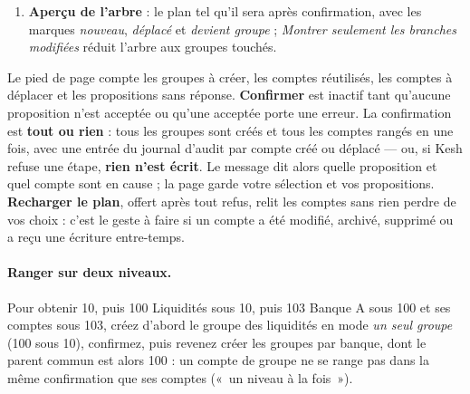 \documentclass[a4paper,11pt,oneside]{article}
\begin{document}
\begin{enumerate}
    Chaque proposition est \emph{en attente} à l'ouverture. \textbf{Accepter} la retient (le bouton
    est inactif tant qu'elle porte une erreur), \textbf{Écarter} la désactive --- elle n'entre ni dans
    l'aperçu ni dans la confirmation, et ses erreurs ne bloquent rien ---, \textbf{Revenir} la remet
    en attente. Changer de sélection recalcule les propositions en gardant vos choix sur
    celles qui restent : ce que vous avez modifié (numéro, nom, parent, comptes décochés, état) est
    gardé, le reste suit la nouvelle sélection. Changer de mode affiche les propositions de l'autre
    mode, avec les choix que vous y aviez faits ; ceux du premier mode vous attendent si vous y
    revenez. Une proposition acceptée dont un changement de la
    \textbf{sélection} modifie les comptes \textbf{repasse en attente} : acceptez-la de nouveau. Si la
    sélection revient exactement aux comptes acceptés, elle \textbf{redevient acceptée} d'elle-même,
    sans nouveau clic, avec les champs tels que vous les avez laissés --- l'aperçu et le pied de page
    montrent cet état. Décocher un compte \emph{dans la proposition} ne la remet pas en attente : elle
    reste acceptée, avec un compte de moins. Un parent choisi qui devient l'un des comptes
    de la proposition est remis \emph{à choisir}.
    \item \textbf{Aperçu de l'arbre} : le plan tel qu'il sera après confirmation, avec les marques
    \emph{nouveau}, \emph{déplacé} et \emph{devient groupe} ; \emph{Montrer seulement les branches
    modifiées} réduit l'arbre aux groupes touchés.
\end{enumerate}

Le pied de page compte les groupes à créer, les comptes réutilisés, les comptes à déplacer et les
propositions sans réponse. \textbf{Confirmer} est inactif tant qu'aucune proposition n'est acceptée
ou qu'une acceptée porte une erreur. La confirmation est \textbf{tout ou rien} : tous les groupes
sont créés et tous les comptes rangés en une fois, avec une entrée du journal d'audit par compte
créé ou déplacé --- ou, si Kesh refuse une étape, \textbf{rien n'est écrit}. Le message dit alors
quelle proposition et quel compte sont en cause ; la page garde votre sélection et vos
propositions. \textbf{Recharger le plan}, offert après tout refus, relit les comptes sans rien perdre
de vos choix : c'est le geste à faire si un compte a été modifié, archivé, supprimé ou a reçu une
écriture entre-temps.

\paragraph{Ranger sur deux niveaux.} Pour obtenir 10, puis 100 Liquidités sous 10, puis 103 Banque A sous 100 et ses comptes sous 103,
créez d'abord le groupe des liquidités en mode \emph{un seul groupe} (100 sous 10), confirmez,
puis revenez créer les groupes par banque, dont le parent commun est alors 100 : un compte de
groupe ne se range pas dans la même confirmation que ses comptes («~un niveau à la fois~»).
\end{document}
